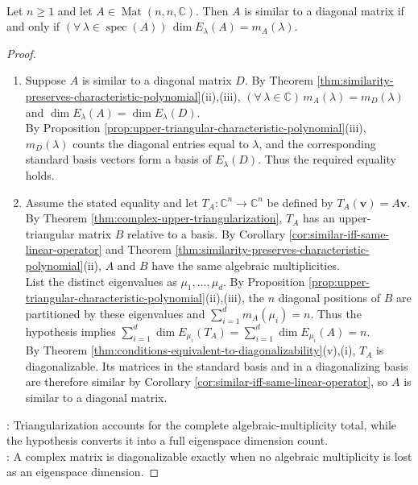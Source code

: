 \begin{theorem} \label{thm:diagonalizable-iff-algebraic-geometric-multiplicities-match} \\
Let $n\geq1$ and let $A\in\operatorname{Mat}(n,n,\mathbb{C})$. Then $A$ is similar to a diagonal matrix if and only if $(\forall\,\lambda\in\operatorname{spec}(A))\,\dim E_{\lambda}(A)=m_A(\lambda)$.
\begin{proof}
\begin{enumerate}[label=\roman*.]
\setlength{\itemsep}{0pt}
\item[$(\Rightarrow)$] Suppose $A$ is similar to a diagonal matrix $D$. By Theorem \ref{thm:similarity-preserves-characteristic-polynomial}(ii),(iii), $(\forall\,\lambda\in\mathbb{C})\,m_A(\lambda)=m_D(\lambda)$ and $\dim E_{\lambda}(A)=\dim E_{\lambda}(D)$.\\
By Proposition \ref{prop:upper-triangular-characteristic-polynomial}(iii), $m_D(\lambda)$ counts the diagonal entries equal to $\lambda$, and the corresponding standard basis vectors form a basis of $E_{\lambda}(D)$. Thus the required equality holds.
\item[$(\Leftarrow)$] Assume the stated equality and let $T_A:\mathbb{C}^n\to\mathbb{C}^n$ be defined by $T_A(\mathbf{v})=A\mathbf{v}$. By Theorem \ref{thm:complex-upper-triangularization}, $T_A$ has an upper-triangular matrix $B$ relative to a basis. By Corollary \ref{cor:similar-iff-same-linear-operator} and Theorem \ref{thm:similarity-preserves-characteristic-polynomial}(ii), $A$ and $B$ have the same algebraic multiplicities.\\
List the distinct eigenvalues as $\mu_1,\ldots,\mu_d$. By Proposition \ref{prop:upper-triangular-characteristic-polynomial}(ii),(iii), the $n$ diagonal positions of $B$ are partitioned by these eigenvalues and $\sum\limits_{i=1}^{d}m_A(\mu_i)=n$. Thus the hypothesis implies $\sum\limits_{i=1}^{d}\dim E_{\mu_i}(T_A)=\sum\limits_{i=1}^{d}\dim E_{\mu_i}(A)=n$.\\
By Theorem \ref{thm:conditions-equivalent-to-diagonalizability}(v),(i), $T_A$ is diagonalizable. Its matrices in the standard basis and in a diagonalizing basis are therefore similar by Corollary \ref{cor:similar-iff-same-linear-operator}, so $A$ is similar to a diagonal matrix.
\end{enumerate}
: Triangularization accounts for the complete algebraic-multiplicity total, while the hypothesis converts it into a full eigenspace dimension count.\\
: A complex matrix is diagonalizable exactly when no algebraic multiplicity is lost as an eigenspace dimension.
\end{proof}
\end{theorem}


